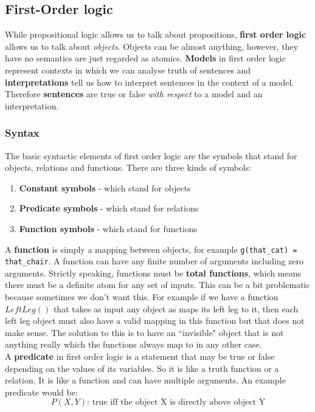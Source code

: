 \documentclass{article}
\newcommand{\n}[0]{\\[\baselineskip]}
\begin{document}
\subsection{First-Order logic}
While propositional logic allows us to talk about propositions, \textbf{first order logic} allows us to talk about \textit{objects}. Objects can be almost anything, however, they have no semantics are just regarded as atomics. \textbf{Models} in first order logic represent contexts in which we can analyse truth of sentences and \textbf{interpretations} tell us how to interpret sentences in the context of a model. Therefore \textbf{sentences} are true or false \textit{with respect} to a model and an interpretation.
\subsubsection{Syntax}
The basic syntactic elements of first order logic are the symbols that stand for objects, relations and functions. There are three kinds of symbols:
\begin{enumerate}
\item \textbf{Constant symbols} - which stand for objects
\item \textbf{Predicate symbols} - which stand for relations
\item \textbf{Function symbols} - which stand for functions
\end{enumerate}
A \textbf{function} is simply a mapping between objects, for example \texttt{g(that\_cat) = that\_chair}. A function can have any finite number of arguments including zero arguments. Strictly speaking, functions must be \textbf{total functions}, which means there must be a definite atom for any set of inputs. This can be a bit problematic because sometimes we don't want this. For example if we have a function $LeftLeg()$ that takes as input any object as maps its left leg to it, then each left leg object must also have a valid mapping in this function but that does not make sense. The solution to this is to have an ``invisible" object that is not anything really which the functions always map to in any other case. 
\n
A \textbf{predicate} in first order logic is a statement that may be true or false depending on the values of its variables. So it is like a truth function or a relation. It is like a function and can have multiple arguments. An example predicate would be: 
\begin{equation}
P(X,Y)\text{: true iff the object X is directly above object Y}
\end{equation}
\end{document}
